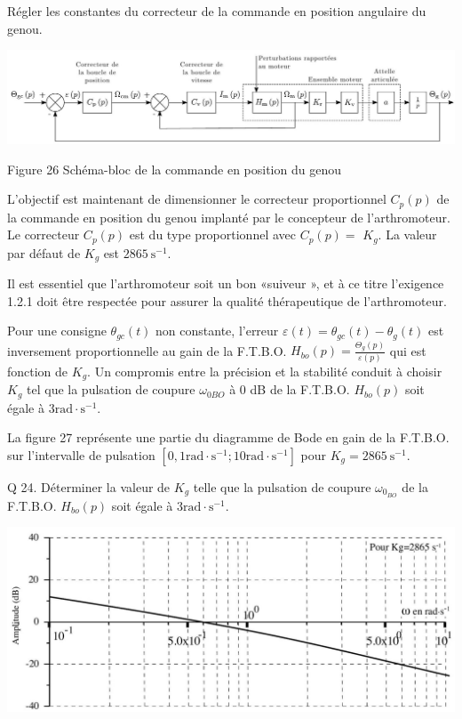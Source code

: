 \documentclass[10pt]{article}
\begin{document}
Régler les constantes du correcteur de la commande en position angulaire du genou.

\begin{center}
\includegraphics[max width=\textwidth]{2024_07_14_a83aebba33898893d39fg-15}
\end{center}

Figure 26 Schéma-bloc de la commande en position du genou

L'objectif est maintenant de dimensionner le correcteur proportionnel $C_{p}(p)$ de la commande en position du genou implanté par le concepteur de l'arthromoteur. Le correcteur $C_{p}(p)$ est du type proportionnel avec $C_{p}(p)=$ $K_{g}$. La valeur par défaut de $K_{g}$ est $2865 \mathrm{~s}^{-1}$.

Il est essentiel que l'arthromoteur soit un bon «suiveur », et à ce titre l'exigence 1.2.1 doit être respectée pour assurer la qualité thérapeutique de l'arthromoteur.

Pour une consigne $\theta_{g c}(t)$ non constante, l'erreur $\varepsilon(t)=\theta_{g c}(t)-\theta_{g}(t)$ est inversement proportionnelle au gain de la F.T.B.O. $H_{b o}(p)=\frac{\Theta_{g}(p)}{\varepsilon(p)}$ qui est fonction de $K_{g}$. Un compromis entre la précision et la stabilité conduit à choisir $K_{g}$ tel que la pulsation de coupure $\omega_{0 B O}$ à 0 dB de la F.T.B.O. $H_{b o}(p)$ soit égale à $3 \mathrm{rad} \cdot \mathrm{s}^{-1}$.

La figure 27 représente une partie du diagramme de Bode en gain de la F.T.B.O. sur l'intervalle de pulsation $\left[0,1 \mathrm{rad} \cdot \mathrm{s}^{-1} ; 10 \mathrm{rad} \cdot \mathrm{s}^{-1}\right]$ pour $K_{g}=2865 \mathrm{~s}^{-1}$.

Q 24. Déterminer la valeur de $K_{g}$ telle que la pulsation de coupure $\omega_{0_{B O}}$ de la F.T.B.O. $H_{b o}(p)$ soit égale à $3 \mathrm{rad} \cdot \mathrm{s}^{-1}$.

\begin{center}
\includegraphics[max width=\textwidth]{2024_07_14_a83aebba33898893d39fg-16(1)}
\end{center}
\end{document}
